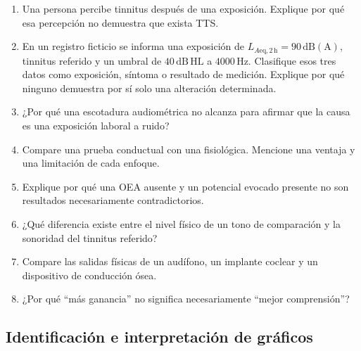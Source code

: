 \begin{enumerate}[label=\textbf{C\arabic*.},leftmargin=*]
    \item Una persona percibe tinnitus después de una exposición. Explique por
    qué esa percepción no demuestra que exista TTS.

    \item En un registro ficticio se informa una exposición de
    \(L_{A\mathrm{eq},2\,\mathrm{h}}=90\,\mathrm{dB(A)}\), tinnitus referido y un umbral
    de \(40\,\mathrm{dB\,HL}\) a \(4000\,\mathrm{Hz}\). Clasifique esos tres
    datos como exposición, síntoma o resultado de medición. Explique por qué
    ninguno demuestra por sí solo una alteración determinada.

    \item ¿Por qué una escotadura audiométrica no alcanza para afirmar que la
    causa es una exposición laboral a ruido?

    \item Compare una prueba conductual con una fisiológica. Mencione una
    ventaja y una limitación de cada enfoque.

    \item Explique por qué una OEA ausente y un potencial evocado presente no
    son resultados necesariamente contradictorios.

    \item ¿Qué diferencia existe entre el nivel físico de un tono de
    comparación y la sonoridad del tinnitus referido?

    \item Compare las salidas físicas de un audífono, un implante coclear y un
    dispositivo de conducción ósea.

    \item ¿Por qué ``más ganancia'' no significa necesariamente ``mejor
    comprensión''?
\end{enumerate}

\subsection*{Identificación e interpretación de gráficos}

